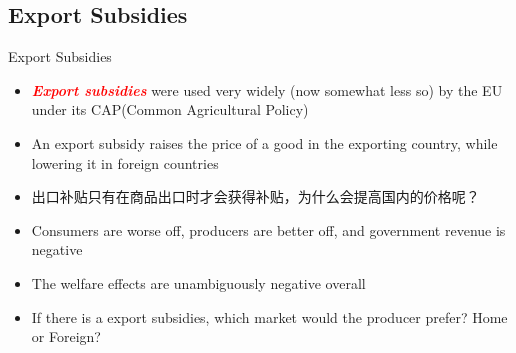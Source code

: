 \documentclass[10pt,hyperref={CJKbookmarks=true},xcolor=dvipsnames,aspectratio=169]{beamer}
\begin{document}




\subsection{Export Subsidies}
\begin{frame}{Export Subsidies}

\begin{itemize}
\item \textbf{\textcolor{red}{\emph{Export subsidies}}} were used very widely
(now somewhat less so) by the EU under its CAP(Common Agricultural
Policy) 
\item An export subsidy raises the price of a good in the exporting country,
while lowering it in foreign countries 
\item 出口补贴只有在商品出口时才会获得补贴，为什么会提高国内的价格呢？
\item Consumers are worse off, producers are better off, and government
revenue is negative 
\item The welfare effects are unambiguously negative overall
\item If there is a export subsidies, which market would the producer prefer?
Home or Foreign?
\end{itemize}
\end{frame}
\end{document}
